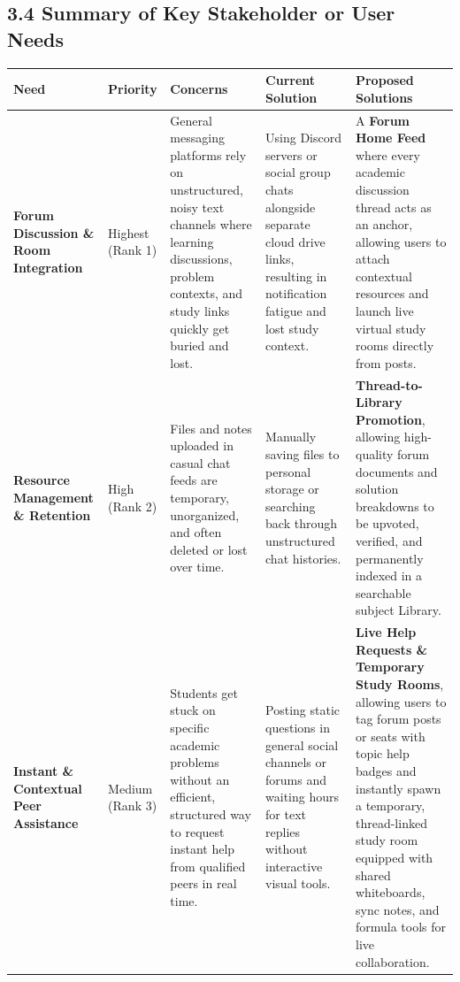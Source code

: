 \documentclass[12pt]{article}
\renewcommand{\baselinestretch}{1.5}
\begin{document}
\subsection*{3.4 Summary of Key Stakeholder or User Needs}
\par\medskip
\begingroup
\scriptsize
\renewcommand{\baselinestretch}{1.0}\selectfont
\renewcommand{\arraystretch}{1.15}
\setlength{\tabcolsep}{4pt}
\begin{longtable}{|>{\raggedright\arraybackslash}p{}|>{\raggedright\arraybackslash}p{}|>{\raggedright\arraybackslash}p{}|>{\raggedright\arraybackslash}p{}|>{\raggedright\arraybackslash}p{}|}
\hline
Need & Priority & Concerns & Current Solution & Proposed Solutions \\ \hline
\endhead
\textbf{Forum Discussion \& Room Integration} & Highest (Rank 1) & General messaging platforms rely on unstructured, noisy text channels where learning discussions, problem contexts, and study links quickly get buried and lost. & Using Discord servers or social group chats alongside separate cloud drive links, resulting in notification fatigue and lost study context. & A \textbf{Forum Home Feed} where every academic discussion thread acts as an anchor, allowing users to attach contextual resources and launch live virtual study rooms directly from posts. \\ \hline
\textbf{Resource Management \& Retention} & High (Rank 2) & Files and notes uploaded in casual chat feeds are temporary, unorganized, and often deleted or lost over time. & Manually saving files to personal storage or searching back through unstructured chat histories. & \textbf{Thread-to-Library Promotion}, allowing high-quality forum documents and solution breakdowns to be upvoted, verified, and permanently indexed in a searchable subject Library. \\ \hline
\textbf{Instant \& Contextual Peer Assistance} & Medium (Rank 3) & Students get stuck on specific academic problems without an efficient, structured way to request instant help from qualified peers in real time. & Posting static questions in general social channels or forums and waiting hours for text replies without interactive visual tools. & \textbf{Live Help Requests \& Temporary Study Rooms}, allowing users to tag forum posts or seats with topic help badges and instantly spawn a temporary, thread-linked study room equipped with shared whiteboards, sync notes, and formula tools for live collaboration. \\ \hline

\end{longtable}
\end{document}
